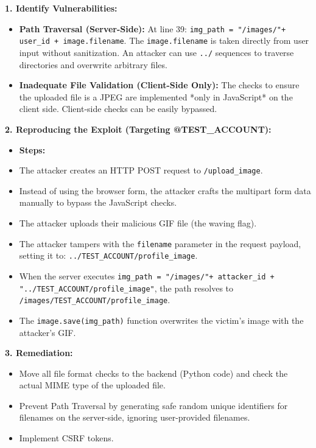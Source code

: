 \documentclass{article}
\begin{document}
\textbf{1. Identify Vulnerabilities:}
\begin{itemize}
    \item \textbf{Path Traversal (Server-Side):} At line 39: \texttt{img\_path = "/images/"+ user\_id + image.filename}. The \texttt{image.filename} is taken directly from user input without sanitization. An attacker can use \texttt{../} sequences to traverse directories and overwrite arbitrary files.
    \item \textbf{Inadequate File Validation (Client-Side Only):} The checks to ensure the uploaded file is a JPEG are implemented *only in JavaScript* on the client side. Client-side checks can be easily bypassed.

\end{itemize}
\textbf{2. Reproducing the Exploit (Targeting @TEST\_ACCOUNT):}
\begin{itemize}
    \item \textbf{Steps:}
    \item[\textbf{1.}] The attacker creates an HTTP POST request to \texttt{/upload\_image}.
    \item[\textbf{2.}] Instead of using the browser form, the attacker crafts the multipart form data manually to bypass the JavaScript checks.
    \item[\textbf{3.}] The attacker uploads their malicious GIF file (the waving flag).
    \item[\textbf{4.}] The attacker tampers with the \texttt{filename} parameter in the request payload, setting it to: \texttt{../TEST\_ACCOUNT/profile\_image}.
    \item[\textbf{5.}] When the server executes \texttt{img\_path = "/images/"+ attacker\_id + "../TEST\_ACCOUNT/profile\_image"}, the path resolves to \texttt{/images/TEST\_ACCOUNT/profile\_image}.
    \item[\textbf{6.}] The \texttt{image.save(img\_path)} function overwrites the victim's image with the attacker's GIF.

\end{itemize}
\textbf{3. Remediation:}
\begin{itemize}
    \item Move all file format checks to the backend (Python code) and check the actual MIME type of the uploaded file.
    \item Prevent Path Traversal by generating safe random unique identifiers for filenames on the server-side, ignoring user-provided filenames.
    \item Implement CSRF tokens.
\end{itemize}
\end{document}
